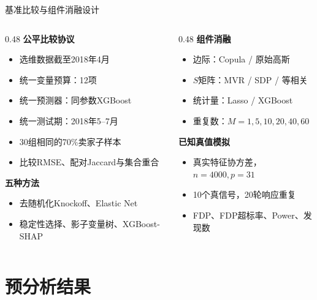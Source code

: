 \documentclass[aspectratio=169]{beamer}
\begin{document}
\begin{frame}{基准比较与组件消融设计}
  \begin{columns}[T]
    \begin{column}{0.48\textwidth}
      \textbf{公平比较协议}
      \begin{itemize}
        \item 选维数据截至2018年4月
        \item 统一变量预算：12项
        \item 统一预测器：同参数XGBoost
        \item 统一测试期：2018年5--7月
        \item 30组相同的70\%卖家子样本
        \item 比较RMSE、配对Jaccard与集合重合
      \end{itemize}
      \textbf{五种方法}
      \begin{itemize}
        \item 去随机化Knockoff、Elastic Net
        \item 稳定性选择、影子变量树、XGBoost-SHAP
      \end{itemize}
    \end{column}
    \begin{column}{0.48\textwidth}
      \textbf{组件消融}
      \begin{itemize}
        \item 边际：Copula / 原始高斯
        \item $S$矩阵：MVR / SDP / 等相关
        \item 统计量：Lasso / XGBoost
        \item 重复数：$M=1,5,10,20,40,60$
      \end{itemize}
      \textbf{已知真值模拟}
      \begin{itemize}
        \item 真实特征协方差，$n=4000,p=31$
        \item 10个真信号，20轮响应重复
        \item FDP、FDP超标率、Power、发现数
      \end{itemize}
    \end{column}
  \end{columns}
\end{frame}

\section{预分析结果}
\end{document}
